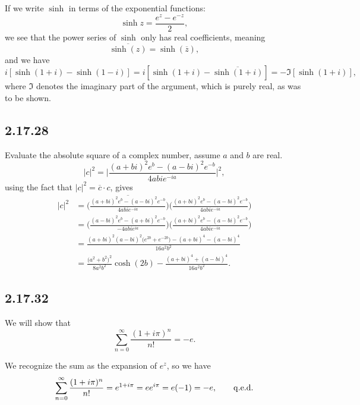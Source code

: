 \documentclass[a4paper, 11pt, titlepage, english]{article}
\begin{document}
If we write $\sinh$ in terms of the exponential functions:
$$\sinh z = \frac{e^{z} - e^{-z}}{2},$$
we see that the power series of $\sinh$ only has real coefficients, meaning 
$$\overline{\sinh(z)} = \sinh(\overline{z}),$$
and we have
$$i[\sinh(1+i) - \sinh(1-i)] = i[\sinh(1+i) - \overline{\sinh(1+i)}] = -\Im[\sinh(1+i)],$$
where $\Im$ denotes the imaginary part of the argument, which is purely real, as was to be shown.

\clearpage

\subsection*{2.17.28}
Evaluate the absolute square of a complex number, assume $a$ and $b$ are real.
$$|c|^2 = \bigg|\frac{(a+bi)^2e^b - (a-bi)^2e^{-b}}{4abie^{-ia}}\bigg|^2,$$
using the fact that $|c|^2 = \overline{c}\cdot c$, gives
\begin{align*}
|c|^2 &= \overline{\bigg(\frac{(a+bi)^2e^b - (a-bi)^2e^{-b}}{4abie^{-ia}}\bigg)}\bigg(\frac{(a+bi)^2e^b - (a-bi)^2e^{-b}}{4abie^{-ia}}\bigg) \\[0.2cm]
&= \bigg(\frac{(a-bi)^2e^b - (a+bi)^2e^{-b}}{-4abie^{ia}}\bigg)\bigg(\frac{(a+bi)^2e^b - (a-bi)^2e^{-b}}{4abie^{-ia}} \bigg) \\[0.2cm]
&= \frac{(a+bi)^2(a-bi)^2\big(e^{2b}+e^{-2b}\big) - (a+bi)^4 - (a-bi)^4}{16a^2b^2} \\[0.2cm]
&= \frac{\big(a^2 + b^2\big)^2}{8a^2b^2}\cosh(2b) - \frac{(a+bi)^4 + (a-bi)^4}{16a^2b^2}.
\end{align*}

\vspace{1cm}

\subsection*{2.17.32}
We will show that
$$\sum_{n=0}^\infty \frac{(1+i\pi)^n}{n!} = -e.$$

We recognize the sum as the expansion of $e^z$, so we have
$$\sum_{n=0}^\infty \frac{(1+i\pi)^n}{n!} = e^{1+i\pi} = ee^{i\pi} = e(-1) = -e, \qquad {\rm q.e.d.}$$
\end{document}
